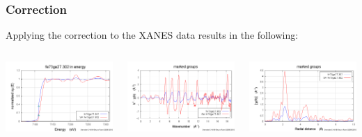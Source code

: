 \documentclass[10pt, xcolor=x11names, compress]{beamer}
\begin{document}
\begin{frame}
  \frametitle{Correction}
  Applying the correction to the XANES data results in the following:

  \bigskip

  \begin{columns}
    \begin{column}{0.33\linewidth}
      \includegraphics[width=\linewidth]{images/fega_mu.png}
    \end{column}
    \begin{column}{0.33\linewidth}
      \includegraphics[width=\linewidth]{images/fega_chik.png}
    \end{column}
    \begin{column}{0.33\linewidth}
      \includegraphics[width=\linewidth]{images/fega_chir.png}

\end{column}
\end{columns}
\end{frame}
\end{document}
